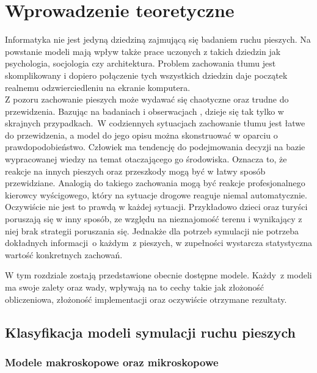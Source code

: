 \chapter{Wprowadzenie teoretyczne}
\label{cha:wprowadzenieTeoretyczne}

Informatyka nie jest jedyną dziedziną zajmującą się badaniem ruchu pieszych. Na powstanie modeli mają wpływ także prace uczonych z takich dziedzin jak psychologia, socjologia czy architektura. Problem zachowania tłumu jest skomplikowany i dopiero połączenie tych wszystkich dziedzin daje początek realnemu odzwierciedleniu na ekranie komputera. \\
Z pozoru zachowanie pieszych może wydawać się chaotyczne oraz trudne do przewidzenia. Bazując na badaniach i obserwacjach \cite{SforceModelForPedDyn}, dzieje się tak tylko w skrajnych przypadkach.~W codziennych sytuacjach zachowanie tłumu jest łatwe do przewidzenia, a model do jego opisu można skonstruować w oparciu o prawdopodobieństwo. Człowiek ma tendencję do podejmowania decyzji na bazie wypracowanej wiedzy na temat otaczającego go środowiska. Oznacza to, że reakcje na innych pieszych oraz przeszkody mogą być w łatwy sposób przewidziane. Analogią do takiego zachowania mogą być reakcje profesjonalnego kierowcy wyścigowego, który na sytuacje drogowe reaguje niemal automatycznie.\\

Oczywiście nie jest to prawdą w każdej sytuacji. Przykładowo dzieci oraz turyści poruszają się w inny sposób, ze względu na nieznajomość terenu i wynikający z niej brak strategii poruszania się. Jednakże dla potrzeb symulacji nie potrzeba dokładnych informacji~o każdym~z pieszych, w zupełności wystarcza statystyczna wartość konkretnych zachowań.

W tym rozdziale zostają przedstawione obecnie dostępne modele. Każdy~z modeli ma swoje zalety oraz wady, wpływają na to cechy takie jak złożoność obliczeniowa, złożoność implementacji oraz oczywiście  otrzymane rezultaty.

\section{Klasyfikacja modeli symulacji ruchu pieszych}
\label{sec:klasyfikacja}

\subsection{Modele makroskopowe oraz mikroskopowe}

